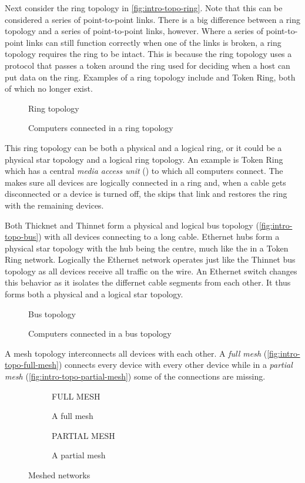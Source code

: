 Next consider the ring topology in \vref{fig:intro-topo-ring}.
Note that this can be considered a series of point-to-point links.
There is a big difference between a ring topology and a series of point-to-point links, however.
Where a series of point-to-point links can still function correctly when one of the links is broken, a ring topology requires the ring to be intact.
This is because the ring topology uses a protocol that passes a token around the ring used for deciding when a host can put data on the ring.
Examples of a ring topology include  and Token Ring, both of which no longer exist.


\begin{figure}
   \centering
   Ring topology
   \caption{Computers connected in a ring topology}
   \label{fig:intro-topo-ring}
\end{figure}


This ring topology can be both a physical and a logical ring, or it could be a physical star topology and a logical ring topology.
An example is Token Ring which has a central \emph{media access unit} () to which all computers connect.
The  makes sure all devices are logically connected in a ring and, when a cable gets disconnected or a device is turned off, the  skips that link and restores the ring with the remaining devices.

Both Thicknet and Thinnet form a physical and logical bus topology (\vref{fig:intro-topo-bus}) with all devices connecting to a long cable.
Ethernet hubs form a physical star topology with the hub being the centre, much like the  in a Token Ring network.
Logically the Ethernet network operates just like the Thinnet bus topology as all devices receive all traffic on the wire.
An Ethernet switch changes this behavior as it isolates the differnet cable segments from each other.
It thus forms both a physical and a logical star topology.


\begin{figure}
   \centering
   Bus topology
   \caption{Computers connected in a bus topology}
   \label{fig:intro-topo-bus}
\end{figure}

A mesh topology interconnects all devices with each other.
A \emph{full mesh} (\vref{fig:intro-topo-full-mesh}) connects every device with every other device while in a \emph{partial mesh} (\vref{fig:intro-topo-partial-mesh}) some of the connections are missing.


\begin{figure}
   \begin{subfigure}[b]{.47\textwidth}
      \centering
      FULL MESH
      \caption{A full mesh}
      \label{fig:intro-topo-full-mesh}
   \end{subfigure}
   \hfill
   \begin{subfigure}[b]{.47\textwidth}
      \centering
      PARTIAL MESH
      \caption{A partial mesh}
      \label{fig:intro-topo-partial-mesh}
   \end{subfigure}
   \caption{Meshed networks}
   \label{fig:intro-topo-mesh}
\end{figure}


